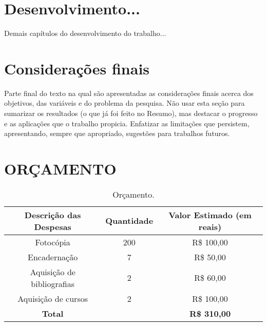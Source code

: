 \documentclass{unemat-tex}
\begin{document}
\chapter{Desenvolvimento...}
	
	Demais capítulos do desenvolvimento do trabalho...

\chapter{Considerações finais}

	Parte final do texto na qual são apresentadas as considerações finais acerca dos objetivos, das variáveis e do problema da pesquisa. Não usar esta seção para sumarizar os resultados (o que já foi feito no Resumo), mas destacar o progresso e as aplicações que o trabalho propicia. Enfatizar as limitações que persistem, apresentando, sempre que apropriado, sugestões para trabalhos futuros.
	
\chapter{ORÇAMENTO}
\begin{table}[!h]
	\caption[Orcamento]{Orçamento.}
	\label{tab-nivinv}	
	\begin{tabular}{|c|c|c|}
		\hline
		\textbf{Descrição das Despesas} & \textbf{Quantidade} & \textbf{Valor Estimado (em reais)} \\ \hline
		Fotocópia & 200 & R\$ 100,00 \\ \hline
		Encadernação & 7 & R\$ 50,00 \\ \hline
		Aquisição de bibliografias & 2 & R\$ 60,00 \\ \hline
		Aquisição de cursos & 2 & R\$ 100,00 \\ \hline
		\textbf{Total} &  & \textbf{R\$ 310,00} \\ \hline
	\end{tabular}
\end{table}




\postextual


\end{document}
